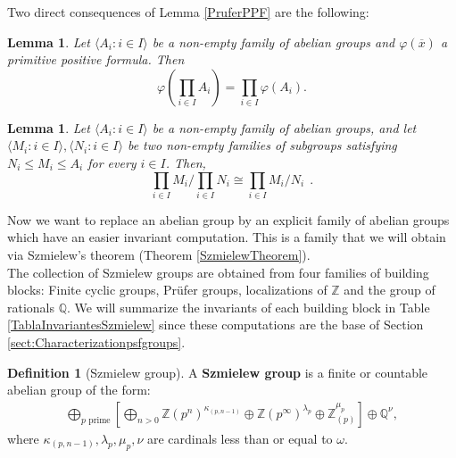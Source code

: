 \documentclass[10pt,a4paper]{amsart}
\newtheorem{lema}[prop]{Lemma}
\theoremstyle{definition}
\newtheorem{definicion}[prop]{Definition}
\newcommand{\bd}{\begin{definicion}}
\newcommand{\ed}{\end{definicion}}
\newcommand{\bl}{\begin{lema}}
\newcommand{\el}{\end{lema}}
\newcommand{\Z}{\mathbb{Z}}
\newcommand{\Q}{\mathbb{Q}}
\newcommand{\ov}[1]{\overline{#1}}
\begin{document}
Two direct consequences of Lemma \ref{PruferPPF} are the following:
\bl \label{ConmutacionPPFormulaProducto}Let $\langle A_i:i\in I\rangle$ be a non-empty family of abelian groups and $\varphi(\ov{x})$ a primitive positive formula. Then
\[\varphi\left(\prod_{i\in I}A_i\right)=\prod_{i\in I}\varphi(A_i).\]
\el

\bl \label{ConmutacionCocienteProducto} Let $\langle A_i:i\in I\rangle$ be a non-empty family of abelian groups, and let $\langle M_i:i\in I\rangle,\langle N_i:i\in I\rangle$ be two non-empty families of subgroups satisfying $N_i\leq M_i\leq A_i$ for every $i\in I$. Then,
\[\prod_{i\in I}M_i\Big/\prod_{i\in I}N_i\cong \prod_{i\in I}M_i/N_i\ \ .\]
\el

Now we want to replace an abelian group by an explicit family of abelian groups which have an easier invariant computation. This is a family that we will obtain via Szmielew's theorem (Theorem \ref{SzmielewTheorem}).\\

The collection of Szmielew groups are obtained from four families of building blocks: Finite cyclic groups, Pr\"ufer groups, localizations of $\Z$ and the group of rationals $\Q$. We will summarize the invariants of each building block in Table \ref{TablaInvariantesSzmielew} since these computations are the base of Section \ref{sect:Characterizationpsfgroups}.
\bd[Szmielew group] \label{SzmielewGroupDefinition} A \textbf{Szmielew group} is a finite or countable abelian group of the form:
\begin{align*}
    \bigoplus_{p \text{ prime}} \left[ \bigoplus_{n>0} \mathbb{Z}(p^{n})^{\kappa_{(p,n-1)}} \oplus \mathbb{Z}(p^{\infty})^{\lambda_{p}} \oplus \mathbb{Z}^{\mu_p}_{(p)} \right] \oplus \mathbb{Q}^{\nu},
\end{align*}
where $\kappa_{(p,n-1)},\lambda_{p},\mu_{p},\nu$ are cardinals less than or equal to $\omega$.
\ed
\end{document}

